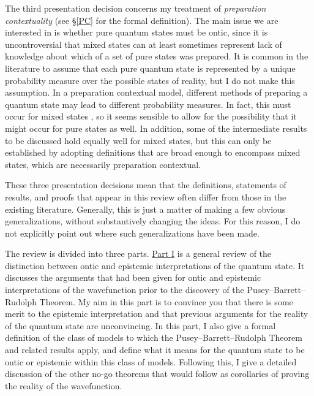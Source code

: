 \documentclass[DIV=calc,fontsize=12pt]{scrartcl} %
\theoremstyle{definition}
\theoremstyle{plain}
\begin{document}
The third presentation decision concerns my treatment of
\emph{preparation contextuality} (see \S\ref{PC} for the formal
definition).  The main issue we are interested in is whether pure
quantum states must be ontic, since it is uncontroversial that mixed
states can at least sometimes represent lack of knowledge about which
of a set of pure states was prepared.  It is common in the literature
to assume that each pure quantum state is represented by a unique
probability measure over the possible states of reality, but I do not
make this assumption.  In a preparation contextual model, different
methods of preparing a quantum state may lead to different probability
measures.  In fact, this must occur for mixed states
\cite{Spekkens2005}, so it seems sensible to allow for the possibility
that it might occur for pure states as well.  In addition, some of the
intermediate results to be discussed hold equally well for mixed
states, but this can only be established by adopting definitions that
are broad enough to encompass mixed states, which are necessarily
preparation contextual.

These three presentation decisions mean that the definitions,
statements of results, and proofs that appear in this review often
differ from those in the existing literature.  Generally, this is just
a matter of making a few obvious generalizations, without
substantively changing the ideas.  For this reason, I do not
explicitly point out where such generalizations have been made.

The review is divided into three parts.  \hyperref[OED]{Part I} is a general
review of the distinction between ontic and epistemic interpretations
of the quantum state.  It discusses the arguments that had been given
for ontic and epistemic interpretations of the wavefunction prior to
the discovery of the Pusey--Barrett--Rudolph Theorem.  My aim in this part is to convince
you that there is some merit to the epistemic interpretation and that
previous arguments for the reality of the quantum state are
unconvincing.  In this part, I also give a formal definition of the
class of models to which the Pusey--Barrett--Rudolph Theorem and related results apply,
and define what it means for the quantum state to be ontic or
epistemic within this class of models.  Following this, I give a
detailed discussion of the other no-go theorems that would follow as
corollaries of proving the reality of the wavefunction.
\end{document}
